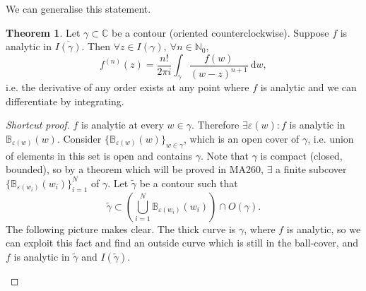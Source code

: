 \documentclass[a4paper]{article}
\theoremstyle{definition}
\newtheorem{thm}[defn]{Theorem}
\begin{document}
We can generalise this statement.
\begin{thm}
Let $\gamma \subset \mathbb C$ be a contour (oriented counterclockwise). Suppose $f$ is analytic in $\overline{I(\gamma)}$. Then $\forall z\in I(\gamma),\ \forall n\in \mathbb N_0$,
\[
f^{(n)}(z) = \frac{n!}{2\pi i} \int_\gamma \frac{f(w)}{(w-z)^{n+1}} \ \mathrm d w,
\]
i.e. the derivative of any order exists at any point where $f$ is analytic and we can differentiate by integrating.
\end{thm}
\begin{proof}[Shortcut proof]
$f$ is analytic at every $w\in \gamma$. Therefore $\exists \varepsilon(w) : f$ is analytic in $\mathbb B_{\varepsilon(w)} (w)$. Consider $\{\mathbb B_{\varepsilon(w)}(w)\}_{w\in \gamma}$, which is an open cover of $\gamma$, i.e. union of elements in this set is open and contains $\gamma$. Note that $\gamma$ is compact (closed, bounded), so by a theorem which will be proved in MA260, $\exists$ a finite subcover $\{\mathbb B_{\varepsilon(w_i)} (w_i)\}_{i=1}^N$ of $\gamma$. Let $\widetilde{\gamma}$ be a contour such that
\[
\widetilde{\gamma} \subset \left( \bigcup_{i=1}^N \mathbb B_{\varepsilon(w_i)} (w_i) \right) \cap O(\gamma).
\]
The following picture makes clear. The thick curve is $\gamma$, where $f$ is analytic, so we can exploit this fact and find an outside curve which is still in the ball-cover, and $f$ is analytic in $\widetilde{\gamma}$ and $I(\widetilde{\gamma})$.
\begin{center}
\end{center}
\end{proof}
\end{document}

